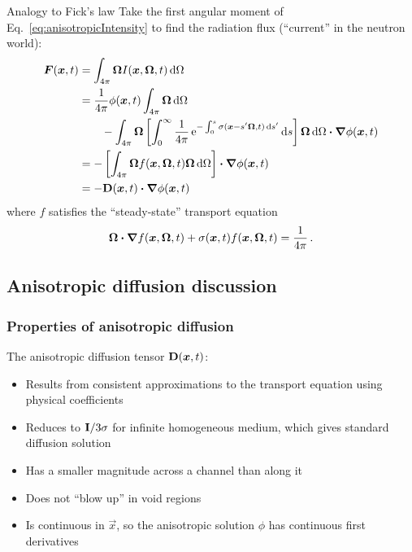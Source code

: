 \documentclass{beamer}
\newcommand{\Dtens}{\mat{D}}
\begin{document}
\begin{frame}{Analogy to Fick's law}
  Take the first angular moment of Eq.~\eqref{eq:anisotropicIntensity} to find
  the radiation flux (``current'' in the neutron world):
\begin{align*}
  \vec{F}(\vec{x}, t) &= \int_{4\pi} \vec{\Omega} I(\vec{x}, \vec{\Omega}, t) \ud \Omega
  \\
  &=
  \frac{1}{4\pi}\phi(\vec{x}, t) \int_{4\pi} \vec{\Omega} \ud \Omega
  \\
  &\qquad-  \int_{4\pi} \vec{\Omega} \left[ \int_{0}^{\infty} \frac{1}{4\pi}
  \eexp^{- \int_{0}^{s} \sigma(\vec{x}-s'\vec{\Omega}, t)
  \ud s'} \ud s\right]
\vec{\Omega}  \ud \Omega \vd \del \phi(\vec{x}, t)
\\
&= - \left[ \int_{4\pi} \vec{\Omega} f(\vec{x},\vec{\Omega},t)
\vec{\Omega}  \ud \Omega \right] \vd \del \phi(\vec{x}, t)
\\
&= - \Dtens(\vec{x},t) \vd \del \phi(\vec{x}, t)
\end{align*}
where $f$ satisfies the ``steady-state'' transport equation
\begin{equation} \label{eq:dcoeffTransportEquation}
  \bm{\Omega}\bm{\cdot} \bm{\nabla} f(\bm{x},\bm{\Omega},t) + \sigma(\bm{x},t) f(\bm{x},\bm{\Omega},t) =
  \frac{1}{4\pi}\,.
\end{equation}
\end{frame}

\subsection{Anisotropic diffusion discussion}
\begin{frame}
  \frametitle{Properties of anisotropic diffusion}

  The anisotropic diffusion tensor $\Dtens(\vec{x},t)$: 
  \begin{itemize}
    \item Results from consistent approximations to the transport equation
      using physical coefficients
    \item Reduces to $\mathbf{I}/3\sigma$ for infinite homogeneous
      medium, which gives standard diffusion solution
    \item Has a smaller magnitude across a channel than along it
    \item Does not ``blow up'' in void regions
    \item Is continuous in $\vec{x}$, so the anisotropic solution $\phi$
      has continuous first derivatives
  \end{itemize}
\end{frame}
\end{document}
